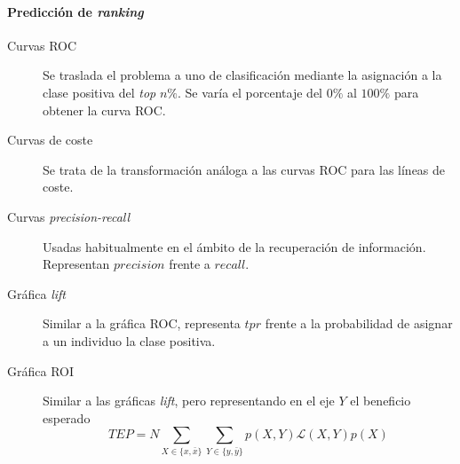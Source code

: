 \paragraph{Predicción de \textit{ranking}} 	
	\begin{description}
		\item[Curvas ROC] Se traslada el problema a uno de clasificación mediante la asignación a la clase positiva del \textit{top} $n\%$. Se varía el porcentaje del $0\%$ al $100\%$ para obtener la curva ROC.
		\item[Curvas de coste] Se trata de la transformación análoga a las curvas ROC para las líneas de coste.
		\item[Curvas \textit{precision-recall}] Usadas habitualmente en el ámbito de la recuperación de información. Representan $precision$ frente a $recall$.
		\item[Gráfica \textit{lift}] Similar a la gráfica ROC, representa $tpr$ frente a la probabilidad de asignar a un individuo la clase positiva. 
		\item[Gráfica ROI] Similar a las gráficas \textit{lift}, pero representando en el eje $Y$ el beneficio esperado 
		\[	TEP = N \sum\limits_{X \in \{x,\bar{x}\}}
					\sum\limits_{Y \in \{y,\bar{y}\}}
						p(X,Y) \mathcal{L}(X,Y) p(X) \]
	\end{description}

